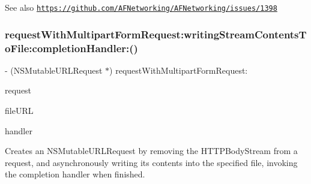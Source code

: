 \begin{DoxySeeAlso}{See also}
\href{https://github.com/AFNetworking/AFNetworking/issues/1398}{\tt https\+://github.\+com/\+A\+F\+Networking/\+A\+F\+Networking/issues/1398} 
\end{DoxySeeAlso}
\mbox{\label{interface_a_f_h_t_t_p_request_serializer_af7a636b437782ad5a93351fcefa5ce46}} 
\subsubsection{\texorpdfstring{request\+With\+Multipart\+Form\+Request\+:writing\+Stream\+Contents\+To\+File\+:completion\+Handler\+:()}{requestWithMultipartFormRequest:writingStreamContentsToFile:completionHandler:()}\hspace{0.1cm}{\footnotesize\ttfamily [2/3]}}
{\footnotesize\ttfamily -\/ (N\+S\+Mutable\+U\+R\+L\+Request $\ast$) request\+With\+Multipart\+Form\+Request\+: \begin{DoxyParamCaption}\item[{(N\+S\+U\+R\+L\+Request $\ast$)}]{request }\item[{writingStreamContentsToFile:(N\+S\+U\+RL $\ast$)}]{file\+U\+RL }\item[{completionHandler:(nullable void($^\wedge$)(N\+S\+Error $\ast$\+\_\+\+\_\+nullable error))}]{handler }\end{DoxyParamCaption}}

Creates an {\ttfamily N\+S\+Mutable\+U\+R\+L\+Request} by removing the {\ttfamily H\+T\+T\+P\+Body\+Stream} from a request, and asynchronously writing its contents into the specified file, invoking the completion handler when finished.


